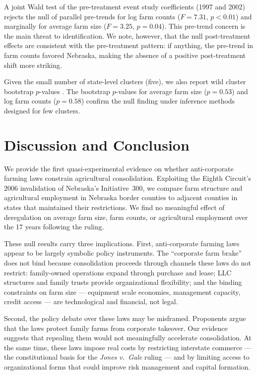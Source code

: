 \documentclass[12pt]{article}
\begin{document}
A joint Wald test of the pre-treatment event study coefficients (1997 and 2002) rejects the null of parallel pre-trends for log farm counts ($F = 7.31$, $p < 0.01$) and marginally for average farm size ($F = 3.25$, $p = 0.04$). This pre-trend concern is the main threat to identification. We note, however, that the null post-treatment effects are consistent with the pre-treatment pattern: if anything, the pre-trend in farm counts favored Nebraska, making the absence of a positive post-treatment shift more striking.

Given the small number of state-level clusters (five), we also report wild cluster bootstrap $p$-values \citep{Cameron2008}. The bootstrap $p$-values for average farm size ($p = 0.53$) and log farm counts ($p = 0.58$) confirm the null finding under inference methods designed for few clusters.



\section{Discussion and Conclusion}\label{sec:conclusion}

We provide the first quasi-experimental evidence on whether anti-corporate farming laws constrain agricultural consolidation. Exploiting the Eighth Circuit's 2006 invalidation of Nebraska's Initiative~300, we compare farm structure and agricultural employment in Nebraska border counties to adjacent counties in states that maintained their restrictions. We find no meaningful effect of deregulation on average farm size, farm counts, or agricultural employment over the 17 years following the ruling.

These null results carry three implications. First, anti-corporate farming laws appear to be largely symbolic policy instruments. The ``corporate farm brake'' does not bind because consolidation proceeds through channels these laws do not restrict: family-owned operations expand through purchase and lease; LLC structures and family trusts provide organizational flexibility; and the binding constraints on farm size --- equipment scale economies, management capacity, credit access --- are technological and financial, not legal.

Second, the policy debate over these laws may be misframed. Proponents argue that the laws protect family farms from corporate takeover. Our evidence suggests that repealing them would not meaningfully accelerate consolidation. At the same time, these laws impose real costs by restricting interstate commerce --- the constitutional basis for the \textit{Jones v.\ Gale} ruling --- and by limiting access to organizational forms that could improve risk management and capital formation.
\end{document}
